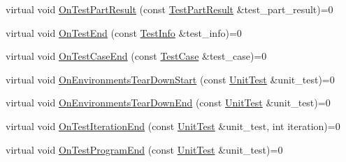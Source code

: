 \begin{DoxyCompactItemize}
\item 
virtual void \hyperlink{classtesting_1_1_test_event_listener_a054f8705c883fa120b91473aff38f2ee}{On\-Test\-Part\-Result} (const \hyperlink{classtesting_1_1_test_part_result}{Test\-Part\-Result} \&test\-\_\-part\-\_\-result)=0
\item 
virtual void \hyperlink{classtesting_1_1_test_event_listener_abb1c44525ef038500608b5dc2f17099b}{On\-Test\-End} (const \hyperlink{classtesting_1_1_test_info}{Test\-Info} \&test\-\_\-info)=0
\item 
virtual void \hyperlink{classtesting_1_1_test_event_listener_ae61985e2ef76ac78379b077be57a9c36}{On\-Test\-Case\-End} (const \hyperlink{classtesting_1_1_test_case}{Test\-Case} \&test\-\_\-case)=0
\item 
virtual void \hyperlink{classtesting_1_1_test_event_listener_a468b5e6701bcb86cb2c956caadbba5e4}{On\-Environments\-Tear\-Down\-Start} (const \hyperlink{classtesting_1_1_unit_test}{Unit\-Test} \&unit\-\_\-test)=0
\item 
virtual void \hyperlink{classtesting_1_1_test_event_listener_a9ea04fa7f447865ba76df35e12ba2092}{On\-Environments\-Tear\-Down\-End} (const \hyperlink{classtesting_1_1_unit_test}{Unit\-Test} \&unit\-\_\-test)=0
\item 
virtual void \hyperlink{classtesting_1_1_test_event_listener_a550fdb3e55726e4cefa09f5697941425}{On\-Test\-Iteration\-End} (const \hyperlink{classtesting_1_1_unit_test}{Unit\-Test} \&unit\-\_\-test, int iteration)=0
\item 
virtual void \hyperlink{classtesting_1_1_test_event_listener_ad15b6246d94c268e233487a86463ef3d}{On\-Test\-Program\-End} (const \hyperlink{classtesting_1_1_unit_test}{Unit\-Test} \&unit\-\_\-test)=0
\end{DoxyCompactItemize}


